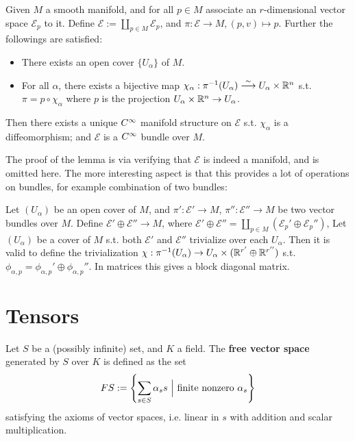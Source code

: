 \documentclass{article}
\begin{document}
\begin{lemma}
    Given $M$ a smooth manifold, and for all $p \in M$ associate an $r$-dimensional vector space $\mathcal{E}_p$ to it. Define $\mathcal{E} := \coprod_{p \in M} \mathcal{E}_p$, and $\pi: \mathcal{E} \to M, (p, v) \mapsto p$. Further the followings are satisfied:
    \begin{itemize}
        \item There exists an open cover $\{U_{\alpha}\}$ of $M$.
        \item For all $\alpha$, there exists a bijective map $\chi_{\alpha}: \pi^{-1}(U_{\alpha}) \overset{\sim}{\longrightarrow} U_{\alpha} \times \mathbb{R}^n$ s.t. $\pi = p \circ \chi_{\alpha}$ where $p$ is the projection $U_{\alpha} \times \mathbb{R}^n \to U_{\alpha}$.
    \end{itemize}
    Then there exists a unique $C^{\infty}$ manifold structure on $\mathcal{E}$ s.t. $\chi_{\alpha}$ is a diffeomorphism; and $\mathcal{E}$ is a $C^{\infty}$ bundle over $M$. 
\end{lemma}

\textstart
The proof of the lemma is via verifying that $\mathcal{E}$ is indeed a manifold, and is omitted here. The more interesting aspect is that this provides a lot of operations on bundles, for example combination of two bundles:

\begin{example}\label{ex: direct sum of vector bundle}

    Let $(U_{\alpha})$ be an open cover of $M$, and $\pi': \mathcal{E}' \to M$, $\pi'': \mathcal{E}'' \to M$ be two vector bundles over $M$. Define $\mathcal{E}' \oplus \mathcal{E}'' \to M$, where $\mathcal{E}' \oplus \mathcal{E}'' = \coprod_{p \in M} (\mathcal{E}_p' \oplus \mathcal{E}_p'')$, Let $(U_{\alpha})$ be a cover of $M$ s.t. both $\mathcal{E}'$ and $\mathcal{E}''$ trivialize over each $U_{\alpha}$. Then it is valid to define the trivialization $\chi: \pi^{-1}(U_{\alpha}) \to U_{\alpha} \times (\mathbb{R}^{r'} \oplus \mathbb{R}^{r''})$ s.t. $\phi_{\alpha, p} = \phi_{\alpha, p}' \oplus \phi_{\alpha, p}''$. In matrices this gives a block diagonal matrix. 
\end{example}

\section{Tensors}

\begin{definition}
    Let $S$ be a (possibly infinite) set, and $K$ a field. The \textbf{free vector space} generated by $S$ over $K$ is defined as the set
    \[
        FS := \left\{ \sum_{s \in S} \alpha_s s \ \Big|\  \text{finite nonzero } \alpha_s \right\}
    \]
    satisfying the axioms of vector spaces, i.e. linear in $s$ with addition and scalar multiplication.
\end{definition}
\end{document}
